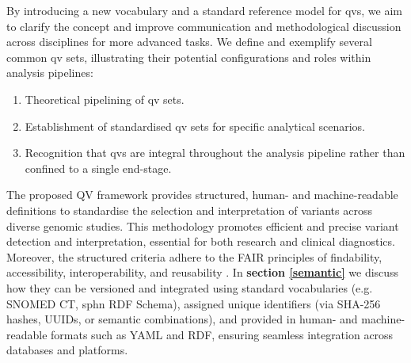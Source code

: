 

By introducing a new vocabulary and a standard reference model for \ac{qv}s, we aim to clarify the concept and improve communication and methodological discussion across disciplines for more advanced tasks.
We define and exemplify several common \ac{qv} sets, illustrating their potential configurations and roles within analysis pipelines:
\begin{enumerate}
    \item Theoretical pipelining of \ac{qv} sets.
    \item Establishment of standardised \ac{qv} sets for specific analytical scenarios.
    \item Recognition that \ac{qv}s are integral throughout the analysis pipeline rather than confined to a single end-stage.
\end{enumerate}

The proposed QV framework provides structured, human- and machine-readable definitions to standardise the selection and interpretation of variants across diverse genomic studies. This methodology promotes efficient and precise variant detection and interpretation, essential for both research and clinical diagnostics. 
Moreover, the structured criteria adhere to the FAIR principles of findability, accessibility, interoperability, and reusability \cite{wilkinson2016fair}. 
In \textbf{section \ref{semantic}} we discuss how they can be versioned and integrated using standard vocabularies (e.g. SNOMED CT, \ac{sphn} RDF Schema), assigned unique identifiers (via SHA-256 hashes, UUIDs, or semantic combinations), and provided in human- and machine-readable formats such as YAML and RDF, ensuring seamless integration across databases and platforms.

